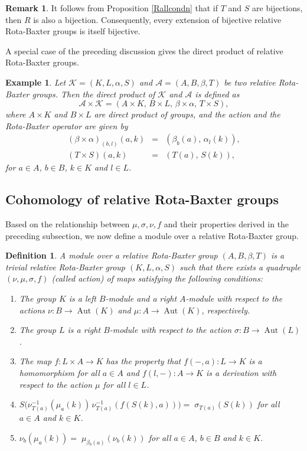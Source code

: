 \documentclass[11pt]{amsart}
\theoremstyle{thrm}
\theoremstyle{plain}
\newtheorem{defn}[thm]{Definition}
\newtheorem{example}[thm]{Example}
\theoremstyle{definition}
\newtheorem{remark}[equation]{Remark}
\newcommand{\Aut}{\operatorname{Aut} }
\numberwithin{equation}{section}
\begin{document}
\begin{remark}\label{bijext}
It follows from Proposition \ref{Rallcondn} that if $T$ and $S$ are bijections, then $R$ is also a bijection. Consequently, every extension of bijective relative Rota-Baxter groups is itself bijective.
\end{remark}

A special case of the preceding discussion gives the direct product of relative Rota-Baxter groups. 

\begin{example}
Let $\mathcal{K}=(K,L,\alpha,S) $ and $\mathcal{A}=(A,B,\beta,T)$ be two relative Rota-Baxter groups. Then the direct product of $\mathcal{K}$ and $\mathcal{A}$ is defined as $$\mathcal{A}\times\mathcal{K}=(A\times K, \, B\times L, \, \beta\times \alpha, \, T\times S),$$ where $A\times K$ and $B\times L$ are direct product of groups,  and the action and the Rota-Baxter operator are given by
	\begin{eqnarray*}
		(\beta\times\alpha)_{(b,l)}(a,k)&=&(\beta_b(a),\,\alpha_l(k)),\\
		(T\times S)(a,k)&=&(T(a),\,S(k)),
	\end{eqnarray*}
for $a \in A$, $b \in B$, $k \in K$ and $l \in L$.
\end{example}
\medskip


\subsection{Cohomology of relative Rota-Baxter groups}\label{subsec cohomology RRB groups}
Based on the relationship between $\mu, \sigma, \nu, f$ and their properties derived in the preceding subsection, we now define a module over a relative Rota-Baxter group.

\begin{defn}\label{moddefn}
	A module over a relative Rota-Baxter group $(A, B,\beta, T)$ is a trivial relative Rota-Baxter group $(K, L, \alpha, S)$ such that there exists a quadruple $(\nu, \mu, \sigma, f)$ (called action) of maps satisfying the following conditions:
	\begin{enumerate}
		\item The group $K$ is a left $B$-module and a right $A$-module with respect to the actions $\nu:B \to \Aut(K) $ and $\mu: A \to \Aut(K)$, respectively.
		\item The group $L$ is a right $B$-module with respect to the action $\sigma: B \to \Aut(L)$.
		\item The  map  $f: L \times A \to K$ has the property that $f(-,a): L \rightarrow K$ is a homomorphism for all $a \in A$ and $f(l,-): A \rightarrow K$ is a derivation with respect to the action $\mu$ for all $l \in L$.
		\item $S\big(\nu^{-1}_{T(a)}(\mu_{a}(k)) \,\nu^{-1}_{T( a)}(f(S(k), a))\big)=\;\sigma_{T(a)}(S(k))$ for all $ a \in A$ and $k \in K$.
		\item $\nu_b(\mu_{a}(k))= \;   \mu_{ \beta{_{b}(a)}}( \nu_{b} (k))$ for all $a \in A$, $b \in B$ and $k \in K$. 
	\end{enumerate}
\end{defn}
\end{document}
